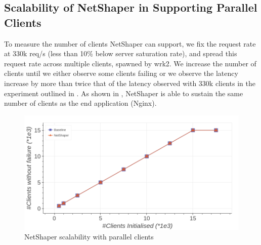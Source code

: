 \subsection{Scalability of NetShaper in Supporting Parallel Clients}
\label{subsec:netshaper-evaluation-num-clients}

To measure the number of clients NetShaper can support, we fix the request rate at 330k req/s (less than 10\% below server saturation rate), and spread this request rate across multiple clients, spawned by wrk2.
We increase the number of clients until we either observe some clients failing or we observe the latency increase by more than twice that of the latency observed with 330k clients in the experiment outlined in .
As shown in , NetShaper is able to sustain the same number of clients as the end application (Nginx).

\begin{figure}[!htb]
    \centering
    \includegraphics[width=\columnwidth]{figures/netshaper/evaluation/num_clients.png}
    \caption{NetShaper scalability with parallel clients}
    \label{fig:netshaper-eval-parallel-clients}
\end{figure}